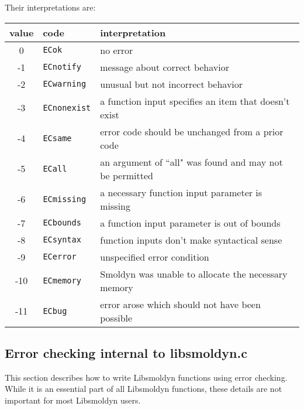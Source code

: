 \documentclass {scrbook}
\newcommand {\ttt} {\texttt}
\begin{document}
Their interpretations are:

\begin{longtable}[c]{cll}
value & code & interpretation\\
\hline
0 & \ttt{ECok} & no error\\
-1 & \ttt{ECnotify} & message about correct behavior\\
-2 & \ttt{ECwarning} & unusual but not incorrect behavior\\
-3 & \ttt{ECnonexist} & a function input specifies an item that doesn't exist\\
-4 & \ttt{ECsame} & error code should be unchanged from a prior code\\
-5 & \ttt{ECall} & an argument of ``all" was found and may not be permitted\\
-6 & \ttt{ECmissing} & a necessary function input parameter is missing\\
-7 & \ttt{ECbounds} & a function input parameter is out of bounds\\
-8 & \ttt{ECsyntax} & function inputs don't make syntactical sense\\
-9 & \ttt{ECerror} & unspecified error condition\\
-10 & \ttt{ECmemory} & Smoldyn was unable to allocate the necessary memory\\
-11 & \ttt{ECbug} & error arose which should not have been possible\\

\end{longtable}

\subsection*{Error checking internal to libsmoldyn.c}

This section describes how to write Libsmoldyn functions using error checking. While it is an essential part of all Libsmoldyn functions, these details are not important for most Libsmoldyn users.
\end{document}
